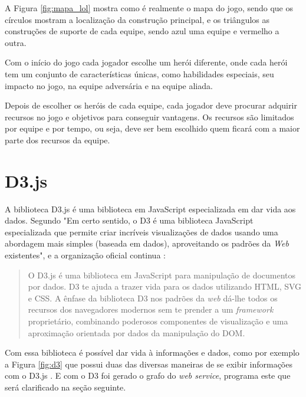 	A Figura \ref{fig:mapa_lol} mostra como é realmente o mapa do jogo, sendo que os círculos mostram a localização da construção principal, e os triângulos as construções de suporte de cada equipe, sendo azul uma equipe e vermelho a outra.
    
	Com o início do jogo cada jogador escolhe  um  herói  diferente, onde  cada  herói tem um conjunto de características únicas, como habilidades especiais,  seu impacto  no jogo,  na equipe adversária e na equipe aliada.
    
	Depois de escolher os heróis de cada equipe, cada jogador deve procurar adquirir recursos no jogo e objetivos para conseguir vantagens. Os recursos são limitados por equipe e por tempo, ou seja, deve ser bem escolhido quem ficará com a maior parte dos recursos da equipe.

\section{D3.js}
A biblioteca D3.js é uma biblioteca em JavaScript especializada em dar vida aos dados. Segundo \citet[tradução do autor]{d3cook} "Em certo sentido, o D3 é uma biblioteca JavaScript especializada que permite criar incríveis visualizações de dados usando uma abordagem mais simples (baseada em dados), aproveitando os padrões da \textit{Web} existentes", e a organização oficial continua :


\begin{quote}
	O D3.js é uma biblioteca em JavaScript para manipulação de documentos por dados. D3 te ajuda a trazer vida para os dados utilizando HTML, SVG e CSS. A ênfase da biblioteca D3 nos padrões da \textit{web} dá-lhe todos os recursos dos navegadores modernos sem te prender a um \textit{framework} proprietário, combinando poderosos componentes de visualização e uma aproximação orientada por dados da manipulação do DOM.
	\cite[tradução do autor]{d3js}
\end{quote}


Com essa biblioteca é possível dar vida à informações e dados, como por exemplo a Figura \ref{fig:d3} que possui duas das diversas maneiras de se exibir informações com o D3.js . E com o D3 foi gerado o grafo do \textit{web service}, programa este que será clarificado na seção seguinte.

